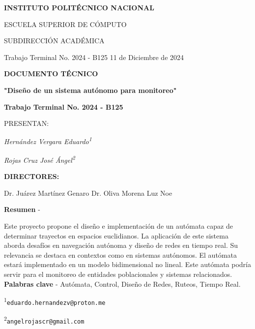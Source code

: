 \begin{titlepage}
    \centering
    {\bfseries\Large INSTITUTO POLIT\'ECNICO NACIONAL \par}
    {\scshape\large ESCUELA SUPERIOR DE C\'OMPUTO \par}
    {\scshape\large SUBDIRECCI\'ON ACAD\'EMICA \par}
    \vspace{1cm}
    
    \begin{flushleft}
        Trabajo Terminal No. 2024 - B125 \hfill 11 de Diciembre de 2024
    \end{flushleft}
    \vspace{1cm}

    {\bfseries\LARGE DOCUMENTO T\'ECNICO \par}
    \vspace{0.5cm}
    {\bfseries\large \textbf{"Dise\~no de un sistema aut\'onomo para monitoreo"} \par}
    \vspace{0.5cm}
    \textbf{Trabajo Terminal No. 2024 - B125 } \par
    \vspace{1cm}

    PRESENTAN: \par
    \vspace{0.5cm}
    \textit{Hern\'andez Vergara Eduardo\textsuperscript{1}} \par
    \textit{Rojas Cruz Jos\'e \'Angel\textsuperscript{2}} \par
    \vspace{0.5cm}

    \textbf{DIRECTORES:} \par
    \vspace{0.5cm}
    Dr. Ju\'arez Mart\'inez Genaro \hfill Dr. Oliva Morena Luz Noe \par
    \vspace{1cm}

    \textbf{Resumen} - \par Este proyecto propone el dise\~no e implementaci\'on de un aut\'omata
        capaz de determinar trayectos en espacios euclidianos. La aplicaci\'on de este sistema 
        aborda desaf\'ios en navegaci\'on aut\'onoma y dise\~no de redes en tiempo real.
        Su relevancia se destaca en contextos como en sistemas aut\'onomos. El aut\'omata
        estar\'a implementado en un modelo bidimensional no lineal. Este aut\'omata podr\'ia 
        servir para el monitoreo de entidades poblacionales y sistemas relacionados.
    \vskip 0.5cm    
    \textbf{Palabras clave} - Aut\'omata, Control, Dise\~no de Redes, Ruteos, Tiempo Real.

    \begin{flushleft}
        \textsuperscript{1}\texttt{eduardo.hernandezv@proton.me} \par
        \textsuperscript{2}\texttt{angelrojascr@gmail.com}
    \end{flushleft}
\end{titlepage}
\newpage
\thispagestyle{empty}
\mbox{} %